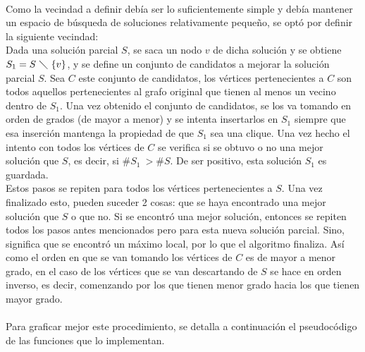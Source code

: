\paragraph{}
Como la vecindad a definir debía ser lo suficientemente simple y debía mantener un espacio de búsqueda de soluciones relativamente pequeño, se optó por definir la siguiente vecindad:\\
Dada una solución parcial $S$, se saca un nodo $v$ de dicha solución y se obtiene $S_1 = S\ \diagdown\ \{v\}$, y se define un conjunto de candidatos a mejorar la solución parcial $S$. Sea $C$ este conjunto de candidatos, los vértices pertenecientes a $C$ son todos aquellos pertenecientes al grafo original que tienen al menos un vecino dentro de $S_1$. Una vez obtenido el conjunto de candidatos, se los va tomando en orden de grados (de mayor a menor) y se intenta insertarlos en $S_1$ siempre que esa inserción mantenga la propiedad de que $S_1$ sea una clique. Una vez hecho el intento con todos los vértices de $C$ se verifica si se obtuvo o no una mejor solución que $S$, es decir, si $\#S_1\ > \#S$. De ser positivo, esta solución $S_1$ es guardada.\\
Estos pasos se repiten para todos los vértices pertenecientes a $S$. Una vez finalizado esto, pueden suceder 2 cosas: que se haya encontrado una mejor solución que $S$ o que no. Si se encontró una mejor solución, entonces se repiten todos los pasos antes mencionados pero para esta nueva solución parcial. Sino, significa que se encontró un máximo local, por lo que el algoritmo finaliza. Así como el orden en que se van tomando los vértices de $C$ es de mayor a menor grado, en el caso de los vértices que se van descartando de $S$ se hace en orden inverso, es decir, comenzando por los que tienen menor grado hacia los que tienen mayor grado.

\paragraph{}
Para graficar mejor este procedimiento, se detalla a continuación el pseudocódigo de las funciones que lo implementan.


